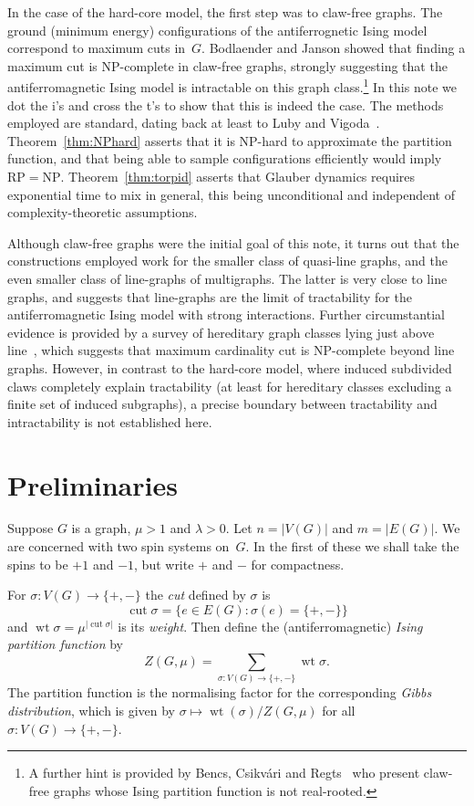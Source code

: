 \documentclass[11pt]{amsart}
\newcommand{\wt}{\mathop{\mathrm{wt}}}
\newcommand{\cut}{\mathop{\mathrm{cut}}}
\newcommand{\NP}{\mathrm{NP}}
\newcommand{\RP}{\mathrm{RP}}
\begin{document}
In the case of the hard-core model, the first step was to claw-free graphs.  The ground (minimum energy) configurations of the antiferrognetic Ising model correspond to maximum cuts in~$G$.  Bodlaender and Janson \cite{BodlaenderJanson} showed that finding a maximum cut is NP-complete in claw-free graphs, strongly suggesting that the antiferromagnetic Ising model is intractable on this graph class.\footnote{A further hint is provided by Bencs, Csikv\'ari and Regts~\cite[\S5]{BencsCsikvariRegts} who present claw-free graphs whose Ising partition function is not real-rooted.}    In this note we dot the i's and cross the t's to show that this is indeed the case. The methods employed are standard, dating back at least to Luby and Vigoda~\cite{LubyVigoda}.  Theorem~\ref{thm:NPhard} asserts that it is NP-hard to approximate the partition function, and that being able to sample configurations efficiently would imply $\RP=\NP$.  Theorem~\ref{thm:torpid} asserts that Glauber dynamics requires exponential time to mix in general, this being unconditional and independent of complexity-theoretic assumptions.

Although claw-free graphs were the initial goal of this note, it turns out that the constructions employed work for the smaller class of quasi-line graphs, and the even smaller class of line-graphs of multigraphs.  The latter is very close to line graphs, and suggests that line-graphs are the limit of tractability for the antiferromagnetic Ising model with strong interactions.  Further circumstantial evidence is provided by a survey of hereditary graph classes lying just above line~\cite{Graphclasses}, which suggests that maximum cardinality cut is NP-complete beyond line graphs.  However, in contrast to the hard-core model, where induced subdivided claws completely explain tractability (at least for hereditary classes excluding a finite set of induced subgraphs), a precise boundary between tractability and intractability is not established here.

\section{Preliminaries}
\label{sec:prelim}

Suppose $G$ is a graph, $\mu>1$ and $\lambda>0$.  Let $n=|V(G)|$ and $m=|E(G)|$.  We are concerned with two spin systems on~$G$.  In the first of these we shall take the spins to be $+1$ and $-1$, but write $+$ and $-$ for compactness.

For $\sigma:V(G)\to \{+,-\}$ the \emph{cut} defined by $\sigma$ is 
$$\cut\sigma=\big\{e\in E(G):\sigma(e)=\{+,-\}\big\}$$ 
and $\wt\sigma=\mu^{|\cut \sigma|}$ is its \emph{weight}.  Then define the (antiferromagnetic) \emph{Ising partition function} by 
$$Z(G,\mu)=\sum_{\sigma:V(G)\to\{+,-\}}\!\!\wt\sigma.$$
The partition function is the normalising factor for the corresponding \emph{Gibbs distribution}, which is given by $\sigma\mapsto\wt(\sigma)/Z(G,\mu)$ for all $\sigma:V(G)\to \{+,-\}$.
\end{document}
